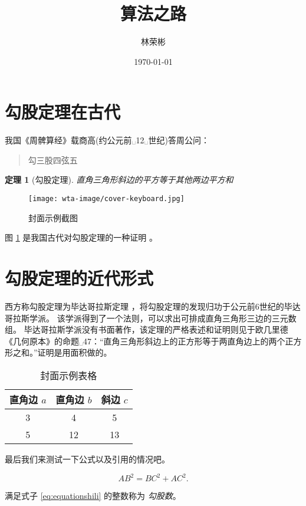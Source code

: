 \documentclass[12pt,a4paper,UTF8]{ctexart}
\title{算法之路}
\author{林荣彬}
\date{\today}
\newtheorem{theorem}{定理}
\begin{document}
\maketitle
\tableofcontents
\section{勾股定理在古代}

我国《周髀算经》载商高(约公元前␣12␣世纪)答周公问：
\begin{quote}
    勾三股四弦五
\end{quote}

\begin{theorem}[勾股定理]
    直角三角形斜边的平方等于其他两边平方和
\end{theorem}

\begin{figure}[ht]
    \centering
    \texttt{[image: wta-image/cover-keyboard.jpg]}
    \caption{封面示例截图}
    \label{fig:jietushili}
\end{figure}

图 \ref{fig:jietushili} 是我国古代对勾股定理的一种证明 \cite{IntroductionToAlgorithms} 。

\section{勾股定理的近代形式}

西方称勾股定理为毕达哥拉斯定理 \cite{IntroductionToAlgorithms}，将勾股定理的发现归功于公元前6世纪的毕达哥拉斯学派。
该学派得到了一个法则，可以求出可排成直角三角形三边的三元数组。
毕达哥拉斯学派没有书面著作，该定理的严格表述和证明则见于欧几里德《几何原本》的命题␣47：``直角三角形斜边上的正方形等于两直角边上的两个正方形之和。''证明是用面积做的。

\begin{table}[H]
    \centering
    \begin{tabular}{|ccc|}
        \hline
        直角边 $a$  &  直角边 $b$  &  斜边 $c$  \\
        \hline
        3 & 4 & 5   \\
        5 & 12 & 13 \\
        \hline
    \end{tabular}
    \caption{封面示例表格}
\end{table}

最后我们来测试一下公式以及引用的情况吧。

\begin{equation}
    \label{eq:equationshili}
    AB^2 = BC^2 + AC^2.
\end{equation}

满足式子 \eqref{eq:equationshili} 的整数称为 \emph{勾股数}。


\end{document}
